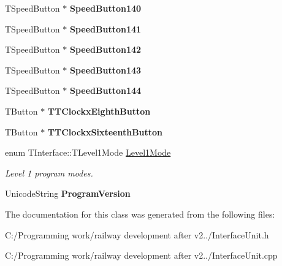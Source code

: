 \begin{DoxyCompactItemize}
\mbox{\label{class_t_interface_a6e1d3e414e9479645a9ce3dc19b77c69}} 
T\+Speed\+Button $\ast$ {\bfseries Speed\+Button140}
\item 
\mbox{\label{class_t_interface_abda1efdc985768dba3dc7b3ff2f9fada}} 
T\+Speed\+Button $\ast$ {\bfseries Speed\+Button141}
\item 
\mbox{\label{class_t_interface_af3b8507dfb89ba79fe353342e79f73bb}} 
T\+Speed\+Button $\ast$ {\bfseries Speed\+Button142}
\item 
\mbox{\label{class_t_interface_a81be9a2f24c16fcddd636cb65416f32f}} 
T\+Speed\+Button $\ast$ {\bfseries Speed\+Button143}
\item 
\mbox{\label{class_t_interface_a67212c07e268f5a78ee5a4fcfe8eaca5}} 
T\+Speed\+Button $\ast$ {\bfseries Speed\+Button144}
\item 
\mbox{\label{class_t_interface_a991c37584b90fb2db61e346e02334ff7}} 
T\+Button $\ast$ {\bfseries T\+T\+Clockx\+Eighth\+Button}
\item 
\mbox{\label{class_t_interface_a93c71b2efb340b53b31e62a8e9ceca47}} 
T\+Button $\ast$ {\bfseries T\+T\+Clockx\+Sixteenth\+Button}
\item 
\mbox{\label{class_t_interface_a4144280e4a8af28178c7949976fc67bd}} 
enum T\+Interface\+::\+T\+Level1\+Mode \mbox{\hyperlink{class_t_interface_a4144280e4a8af28178c7949976fc67bd}{Level1\+Mode}}
\begin{DoxyCompactList}\small\item\em Level 1 program modes. \end{DoxyCompactList}\item 
\mbox{\label{class_t_interface_a83d8b6f4fbf587f117e4e166259190d4}} 
Unicode\+String {\bfseries Program\+Version}
\end{DoxyCompactItemize}


The documentation for this class was generated from the following files\+:\begin{DoxyCompactItemize}
\item 
C\+:/\+Programming work/railway development after v2../Interface\+Unit.\+h\item 
C\+:/\+Programming work/railway development after v2../Interface\+Unit.\+cpp\end{DoxyCompactItemize}
